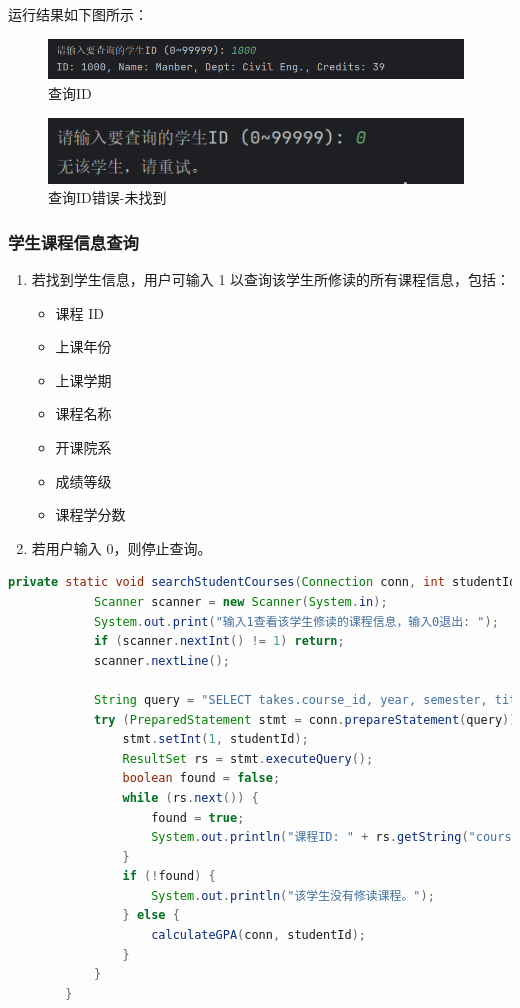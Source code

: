 \documentclass{article}
\begin{document}
	运行结果如下图所示：
	
	\begin{figure}[H]
		\centering
		\includegraphics[width=11cm]{./images/20.查询ID.png}
		\caption{查询ID}
	\end{figure}
	
	\begin{figure}[H]
		\centering
		\includegraphics[width=11cm]{./images/21.查询ID错误.png}
		\caption{查询ID错误-未找到}
	\end{figure}
	
	\subsubsection{学生课程信息查询}
	\begin{enumerate}
		\item 若找到学生信息，用户可输入 1 以查询该学生所修读的所有课程信息，包括：
		\begin{itemize}
			\item 课程 ID
			\item 上课年份
			\item 上课学期
			\item 课程名称
			\item 开课院系
			\item 成绩等级
			\item 课程学分数
		\end{itemize}
		\item 若用户输入 0，则停止查询。
	\end{enumerate}
	
	\begin{lstlisting}[language=java, title=学生课程信息查询, tabsize=4]
		private static void searchStudentCourses(Connection conn, int studentId) throws SQLException {
			Scanner scanner = new Scanner(System.in);
			System.out.print("输入1查看该学生修读的课程信息，输入0退出: ");
			if (scanner.nextInt() != 1) return;
			scanner.nextLine();
			
			String query = "SELECT takes.course_id, year, semester, title, dept_name, grade, credits FROM takes JOIN course ON takes.course_id = course.course_id WHERE ID = ?";
			try (PreparedStatement stmt = conn.prepareStatement(query)) {
				stmt.setInt(1, studentId);
				ResultSet rs = stmt.executeQuery();
				boolean found = false;
				while (rs.next()) {
					found = true;
					System.out.println("课程ID: " + rs.getString("course_id") + ", 年份: " + rs.getInt("year") + ", 学期: " + rs.getString("semester") + ", 课程名: " + rs.getString("title") + ", 院系: " + rs.getString("dept_name") + ", 成绩: " + rs.getString("grade") + ", 学分: " + rs.getInt("credits"));
				}
				if (!found) {
					System.out.println("该学生没有修读课程。");
				} else {
					calculateGPA(conn, studentId);
				}
			}
		}
	\end{lstlisting}
	
\end{document}
